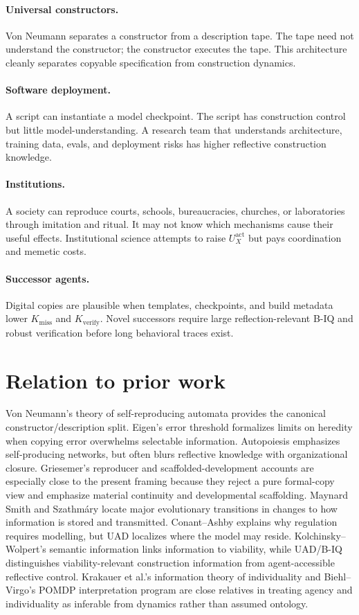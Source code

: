 \documentclass[11pt]{article}
\begin{document}
\paragraph{Universal constructors.} Von Neumann separates a constructor from a description tape. The tape need not understand the constructor; the constructor executes the tape. This architecture cleanly separates copyable specification from construction dynamics.

\paragraph{Software deployment.} A script can instantiate a model checkpoint. The script has construction control but little model-understanding. A research team that understands architecture, training data, evals, and deployment risks has higher reflective construction knowledge.

\paragraph{Institutions.} A society can reproduce courts, schools, bureaucracies, churches, or laboratories through imitation and ritual. It may not know which mechanisms cause their useful effects. Institutional science attempts to raise $U_X^{\mathrm{act}}$ but pays coordination and memetic costs.

\paragraph{Successor agents.} Digital copies are plausible when templates, checkpoints, and build metadata lower $K_{\mathrm{miss}}$ and $K_{\mathrm{verify}}$. Novel successors require large reflection-relevant B-IQ and robust verification before long behavioral traces exist.

\section{Relation to prior work}

Von Neumann's theory of self-reproducing automata provides the canonical constructor/description split. Eigen's error threshold formalizes limits on heredity when copying error overwhelms selectable information. Autopoiesis emphasizes self-producing networks, but often blurs reflective knowledge with organizational closure. Griesemer's reproducer and scaffolded-development accounts are especially close to the present framing because they reject a pure formal-copy view and emphasize material continuity and developmental scaffolding. Maynard Smith and Szathm\'ary locate major evolutionary transitions in changes to how information is stored and transmitted. Conant--Ashby explains why regulation requires modelling, but UAD localizes where the model may reside. Kolchinsky--Wolpert's semantic information links information to viability, while UAD/B-IQ distinguishes viability-relevant construction information from agent-accessible reflective control. Krakauer et al.'s information theory of individuality and Biehl--Virgo's POMDP interpretation program are close relatives in treating agency and individuality as inferable from dynamics rather than assumed ontology.
\end{document}
